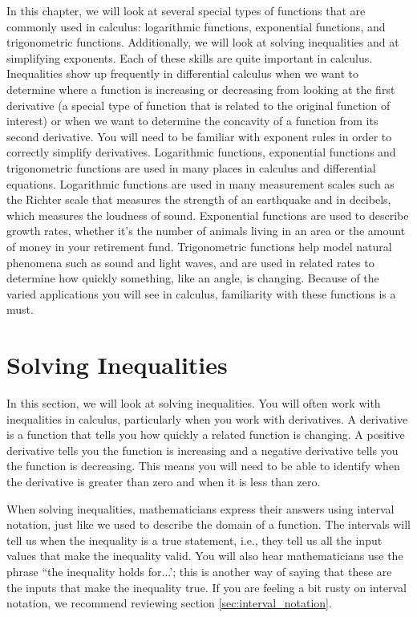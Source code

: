 In this chapter, we will look at several special types of functions that are commonly used in calculus: logarithmic functions, exponential functions, and trigonometric functions. Additionally, we will look at solving inequalities and at simplifying exponents. Each of these skills are quite important in calculus. Inequalities show up frequently in differential calculus when we want to determine where a function is increasing or decreasing from looking at the first derivative (a special type of function that is related to the original function of interest) or when we want to determine  the concavity of a function from its second derivative. You will need to be familiar with exponent rules in order to correctly simplify derivatives. Logarithmic functions, exponential functions and trigonometric functions are used in many places in calculus and differential equations. Logarithmic functions are used in many measurement scales such as the Richter scale that measures the strength of an earthquake and in decibels, which measures the loudness of sound. Exponential functions are used to describe growth rates, whether it's the number of animals living in an area or the amount of money in your retirement fund. Trigonometric functions help model natural phenomena such as sound and light waves, and are used in related rates to determine how quickly something, like an angle, is changing. Because of the varied applications you will see in calculus, familiarity with these functions is a must. 

\section{Solving Inequalities}\label{sec:inequalities}

In this section, we will look at solving inequalities. You will often work with inequalities in calculus, particularly when you work with derivatives. A derivative is a function that tells you how quickly a related function is changing. A positive derivative tells you the function is increasing and a negative derivative tells you the function is decreasing. This means you will need to be able to identify when the derivative is greater than zero and when it is less than zero.

When solving inequalities, mathematicians express their answers using interval notation, just like we used to describe the domain of a function. The intervals will tell us when the inequality is a true statement, i.e., they tell us all the input values that make the inequality valid. You will also hear mathematicians use the phrase ``the inequality holds for...'; this is another way of saying that these are the inputs that make the inequality true. If you are feeling a bit rusty on interval notation, we recommend reviewing section \ref{sec:interval_notation}.

